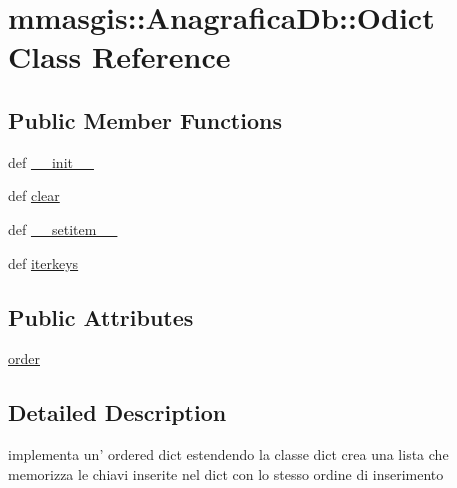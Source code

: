 \hypertarget{classmmasgis_1_1AnagraficaDb_1_1Odict}{
\section{mmasgis::AnagraficaDb::Odict Class Reference}
\label{classmmasgis_1_1AnagraficaDb_1_1Odict}
}
\subsection*{Public Member Functions}
\begin{DoxyCompactItemize}
\item 
def \hyperlink{classmmasgis_1_1AnagraficaDb_1_1Odict_aeb877c30f14d9f1d8135940083d83d57}{\_\-\_\-init\_\-\_\-}
\item 
def \hyperlink{classmmasgis_1_1AnagraficaDb_1_1Odict_a8271ebf81c2ba45435a8d41ae7f6a22c}{clear}
\item 
def \hyperlink{classmmasgis_1_1AnagraficaDb_1_1Odict_aa966c705a0195b503ad97d137606fafc}{\_\-\_\-setitem\_\-\_\-}
\item 
def \hyperlink{classmmasgis_1_1AnagraficaDb_1_1Odict_a41fa9cd0b8b83ee43c432c2b91a7070d}{iterkeys}
\end{DoxyCompactItemize}
\subsection*{Public Attributes}
\begin{DoxyCompactItemize}
\item 
\hyperlink{classmmasgis_1_1AnagraficaDb_1_1Odict_a4c251ec2a665ddb4b5fec6d89a4f994a}{order}
\end{DoxyCompactItemize}


\subsection{Detailed Description}
\begin{DoxyVerb}
implementa un' ordered dict estendendo la classe dict
crea una lista che memorizza le chiavi inserite nel dict  con lo stesso ordine di inserimento
\end{DoxyVerb}
 

